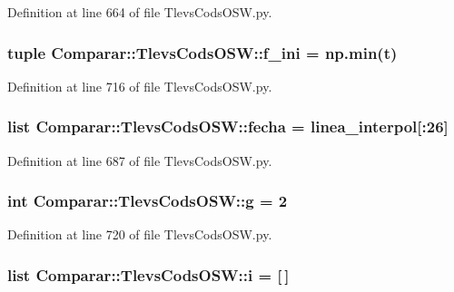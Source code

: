 \-Definition at line 664 of file \-Tlevs\-Cods\-O\-S\-W.\-py.

\subsubsection[{f\-\_\-ini}]{\setlength{\rightskip}{0pt plus 5cm}tuple {\bf \-Comparar\-::\-Tlevs\-Cods\-O\-S\-W\-::f\-\_\-ini} = np.\-min({\bf t})}\label{namespace_comparar_1_1_tlevs_cods_o_s_w_a383f7c9987353b1748212a0b1bf3b902}


\-Definition at line 716 of file \-Tlevs\-Cods\-O\-S\-W.\-py.

\subsubsection[{fecha}]{\setlength{\rightskip}{0pt plus 5cm}list {\bf \-Comparar\-::\-Tlevs\-Cods\-O\-S\-W\-::fecha} = {\bf linea\-\_\-interpol}[\-:26]}\label{namespace_comparar_1_1_tlevs_cods_o_s_w_a102df5f7aed3ecdf411aaac705734a66}


\-Definition at line 687 of file \-Tlevs\-Cods\-O\-S\-W.\-py.

\subsubsection[{g}]{\setlength{\rightskip}{0pt plus 5cm}int {\bf \-Comparar\-::\-Tlevs\-Cods\-O\-S\-W\-::g} = 2}\label{namespace_comparar_1_1_tlevs_cods_o_s_w_a449cb974121e81b552d6db4a153b09d5}


\-Definition at line 720 of file \-Tlevs\-Cods\-O\-S\-W.\-py.

\subsubsection[{i}]{\setlength{\rightskip}{0pt plus 5cm}list {\bf \-Comparar\-::\-Tlevs\-Cods\-O\-S\-W\-::i} = [$\,$]}\label{namespace_comparar_1_1_tlevs_cods_o_s_w_a2f6fee3a94d4f13e4c2a52f58fb847aa}



